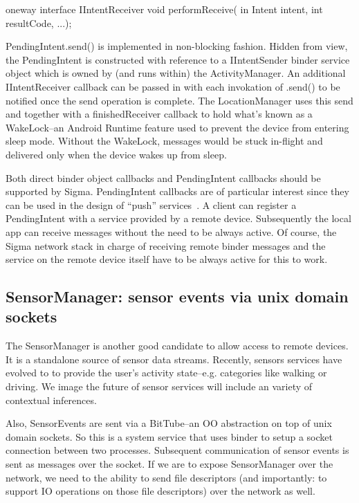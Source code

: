 \documentclass[prodmode]{acmlarge}
\begin{document}
\begin{snippet}
oneway interface IIntentReceiver {
  void performReceive(
      in Intent intent, int resultCode,
      ...);
}
\end{snippet}

PendingIntent.send() is implemented in non-blocking fashion. Hidden from view, the PendingIntent is constructed with reference to a IIntentSender binder service object which is owned by (and runs within) the ActivityManager. An additional IIntentReceiver callback can be passed in with each invokation of .send() to be notified once the send operation is complete. The LocationManager uses this send and together with a finishedReceiver callback to hold what's known as a WakeLock--an Android Runtime feature used to prevent the device from entering sleep mode. Without the WakeLock, messages would be stuck in-flight and delivered only when the device wakes up from sleep.

Both direct binder object callbacks and PendingIntent callbacks should be supported by Sigma. PendingIntent callbacks are of particular interest since they can be used in the design of ``push'' services~\cite{PushTechnology}. A client can register a PendingIntent with a service provided by a remote device. Subsequently the local app can receive messages without the need to be always active. Of course, the Sigma network stack in charge of receiving remote binder messages and the service on the remote device itself have to be always active for this to work.

\subsection{SensorManager: sensor events via unix domain sockets}
The SensorManager is another good candidate to allow access to remote devices. It is a standalone source of sensor data streams. Recently, sensors services have evolved to to provide the user's activity state--e.g. categories like walking or driving. We image the future of sensor services will include an variety of contextual inferences.

Also, SensorEvents are sent via a BitTube--an OO abstraction on top of unix domain sockets. So this is a system service that uses binder to setup a socket connection between two processes. Subsequent communication of sensor events is sent as messages over the socket. If we are to expose SensorManager over the network, we need to the ability to send file descriptors (and importantly: to support IO operations on those file descriptors) over the network as well.
\end{document}
